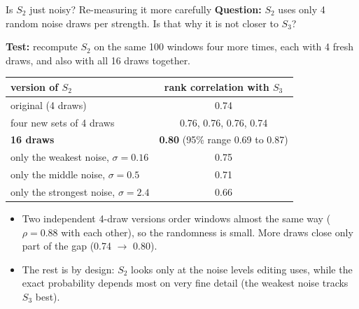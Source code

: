 \documentclass[aspectratio=169,10pt]{beamer}
\begin{document}
\begin{frame}{Is $S_2$ just noisy? Re-measuring it more carefully}
\textbf{Question:} $S_2$ uses only 4 random noise draws per strength. Is that why it is not closer to $S_3$?
\vspace{0.3em}

\textbf{Test:} recompute $S_2$ on the same 100 windows four more times, each with 4 fresh draws, and also with all 16 draws together.
\vspace{0.4em}

\centering
\begin{tabular}{lc}
\toprule
version of $S_2$ & rank correlation with $S_3$\\
\midrule
original (4 draws) & 0.74\\
four new sets of 4 draws & 0.76, 0.76, 0.76, 0.74\\
\textbf{16 draws} & \textbf{0.80} (95\% range 0.69 to 0.87)\\
\midrule
only the weakest noise, $\sigma = 0.16$ & 0.75\\
only the middle noise, $\sigma = 0.5$ & 0.71\\
only the strongest noise, $\sigma = 2.4$ & 0.66\\
\bottomrule
\end{tabular}
\vspace{0.5em}

\raggedright
\begin{itemize}
\item Two independent 4-draw versions order windows almost the same way ($\rho = 0.88$ with each other), so the randomness is small. More draws close only part of the gap (0.74 $\to$ 0.80).
\item The rest is by design: $S_2$ looks only at the noise levels editing uses, while the exact probability depends most on very fine detail (the weakest noise tracks $S_3$ best).
\end{itemize}
\end{frame}
\end{document}
